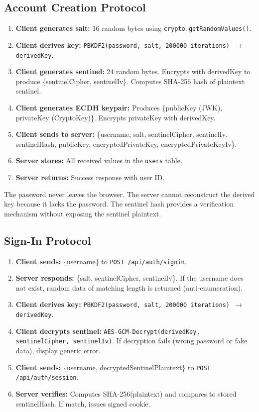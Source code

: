 \subsection{Account Creation Protocol}

\begin{enumerate}
    \item \textbf{Client generates salt:} 16 random bytes using \texttt{crypto.getRandomValues()}.
    \item \textbf{Client derives key:} \texttt{PBKDF2(password, salt, 200000 iterations) $\rightarrow$ derivedKey}.
    \item \textbf{Client generates sentinel:} 24 random bytes. Encrypts with derivedKey to produce \{sentinelCipher, sentinelIv\}. Computes SHA-256 hash of plaintext sentinel.
    \item \textbf{Client generates ECDH keypair:} Produces \{publicKey (JWK), privateKey (CryptoKey)\}. Encrypts privateKey with derivedKey.
    \item \textbf{Client sends to server:} \{username, salt, sentinelCipher, sentinelIv, sentinelHash, publicKey, encryptedPrivateKey, encryptedPrivateKeyIv\}.
    \item \textbf{Server stores:} All received values in the \texttt{users} table.
    \item \textbf{Server returns:} Success response with user ID.
\end{enumerate}

The password never leaves the browser. The server cannot reconstruct the derived key because it lacks the password. The sentinel hash provides a verification mechanism without exposing the sentinel plaintext.

\subsection{Sign-In Protocol}

\begin{enumerate}
    \item \textbf{Client sends:} \{username\} to \texttt{POST /api/auth/signin}.
    \item \textbf{Server responds:} \{salt, sentinelCipher, sentinelIv\}. If the username does not exist, random data of matching length is returned (anti-enumeration).
    \item \textbf{Client derives key:} \texttt{PBKDF2(password, salt, 200000 iterations) $\rightarrow$ derivedKey}.
    \item \textbf{Client decrypts sentinel:} \texttt{AES-GCM-Decrypt(derivedKey, sentinelCipher, sentinelIv)}. If decryption fails (wrong password or fake data), display generic error.
    \item \textbf{Client sends:} \{username, decryptedSentinelPlaintext\} to \texttt{POST /api/auth/session}.
    \item \textbf{Server verifies:} Computes SHA-256(plaintext) and compares to stored sentinelHash. If match, issues signed cookie.
\end{enumerate}

